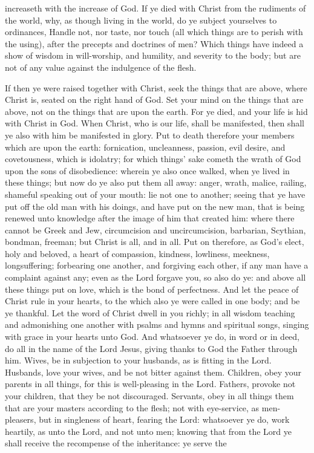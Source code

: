 increaseth with the increase of God.  If ye died with Christ from the rudiments of the world, why, as though living in the world, do ye subject yourselves to ordinances, Handle not, nor taste, nor touch (all which things are to perish with the using), after the precepts and doctrines of men? Which things have indeed a show of wisdom in will-worship, and humility, and severity to the body; but are not of any value against the indulgence of the flesh. 

If then ye were raised together with Christ, seek the things that are above, where Christ is, seated on the right hand of God. Set your mind on the things that are above, not on the things that are upon the earth. For ye died, and your life is hid with Christ in God. When Christ, who is our life, shall be manifested, then shall ye also with him be manifested in glory.  Put to death therefore your members which are upon the earth: fornication, uncleanness, passion, evil desire, and covetousness, which is idolatry; for which things’ sake cometh the wrath of God upon the sons of disobedience: wherein ye also once walked, when ye lived in these things; but now do ye also put them all away: anger, wrath, malice, railing, shameful speaking out of your mouth: lie not one to another; seeing that ye have put off the old man with his doings, and have put on the new man, that is being renewed unto knowledge after the image of him that created him: where there cannot be Greek and Jew, circumcision and uncircumcision, barbarian, Scythian, bondman, freeman; but Christ is all, and in all.  Put on therefore, as God’s elect, holy and beloved, a heart of compassion, kindness, lowliness, meekness, longsuffering; forbearing one another, and forgiving each other, if any man have a complaint against any; even as the Lord forgave you, so also do ye: and above all these things put on love, which is the bond of perfectness. And let the peace of Christ rule in your hearts, to the which also ye were called in one body; and be ye thankful. Let the word of Christ dwell in you richly; in all wisdom teaching and admonishing one another with psalms and hymns and spiritual songs, singing with grace in your hearts unto God. And whatsoever ye do, in word or in deed, do all in the name of the Lord Jesus, giving thanks to God the Father through him.  Wives, be in subjection to your husbands, as is fitting in the Lord. Husbands, love your wives, and be not bitter against them. Children, obey your parents in all things, for this is well-pleasing in the Lord. Fathers, provoke not your children, that they be not discouraged. Servants, obey in all things them that are your masters according to the flesh; not with eye-service, as men-pleasers, but in singleness of heart, fearing the Lord: whatsoever ye do, work heartily, as unto the Lord, and not unto men; knowing that from the Lord ye shall receive the recompense of the inheritance: ye serve the 